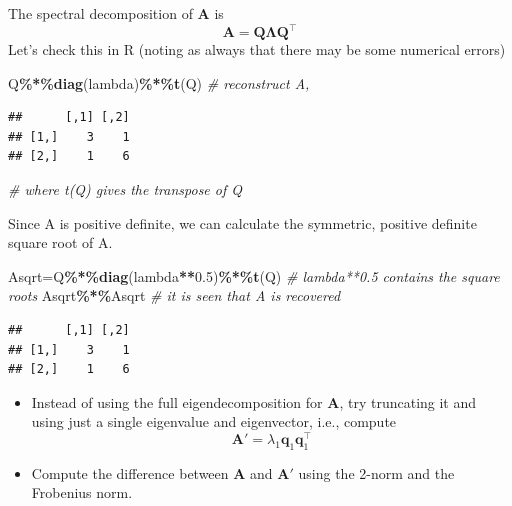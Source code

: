 \documentclass[
]{book}
\newenvironment{Shaded}{\begin{snugshade}}{\end{snugshade}}
\newcommand{\CommentTok}[1]{\textcolor[rgb]{0.56,0.35,0.01}{\textit{#1}}}
\newcommand{\FloatTok}[1]{\textcolor[rgb]{0.00,0.00,0.81}{#1}}
\newcommand{\FunctionTok}[1]{\textcolor[rgb]{0.13,0.29,0.53}{\textbf{#1}}}
\newcommand{\NormalTok}[1]{#1}
\newcommand{\OtherTok}[1]{\textcolor[rgb]{0.56,0.35,0.01}{#1}}
\newcommand{\SpecialCharTok}[1]{\textcolor[rgb]{0.81,0.36,0.00}{\textbf{#1}}}
\providecommand{\tightlist}{%
  \setlength{\itemsep}{0pt}\setlength{\parskip}{0pt}}
\theoremstyle{definition}
\theoremstyle{definition}
\theoremstyle{definition}
\theoremstyle{definition}
\theoremstyle{remark}
\begin{document}
The spectral decomposition of \(\mathbf A\) is
\[\mathbf A= \mathbf Q\boldsymbol \Lambda\mathbf Q^\top\]
Let's check this in R (noting as always that there may be some numerical errors)

\begin{Shaded}
\begin{Highlighting}[]
\NormalTok{Q}\SpecialCharTok{\%*\%}\FunctionTok{diag}\NormalTok{(lambda)}\SpecialCharTok{\%*\%}\FunctionTok{t}\NormalTok{(Q)          }\CommentTok{\# reconstruct A,}
\end{Highlighting}
\end{Shaded}

\begin{verbatim}
##      [,1] [,2]
## [1,]    3    1
## [2,]    1    6
\end{verbatim}

\begin{Shaded}
\begin{Highlighting}[]
                                   \CommentTok{\# where t(Q) gives the transpose of Q}
\end{Highlighting}
\end{Shaded}

Since A is positive definite, we can calculate the symmetric, positive definite square root of A.

\begin{Shaded}
\begin{Highlighting}[]
\NormalTok{Asqrt}\OtherTok{=}\NormalTok{Q}\SpecialCharTok{\%*\%}\FunctionTok{diag}\NormalTok{(lambda}\SpecialCharTok{**}\FloatTok{0.5}\NormalTok{)}\SpecialCharTok{\%*\%}\FunctionTok{t}\NormalTok{(Q) }\CommentTok{\# lambda**0.5 contains the square roots}
\NormalTok{Asqrt}\SpecialCharTok{\%*\%}\NormalTok{Asqrt                      }\CommentTok{\# it is seen that A is recovered}
\end{Highlighting}
\end{Shaded}

\begin{verbatim}
##      [,1] [,2]
## [1,]    3    1
## [2,]    1    6
\end{verbatim}

\begin{itemize}
\tightlist
\item
  Instead of using the full eigendecomposition for \(\mathbf A\), try truncating it and using just a single eigenvalue and eigenvector, i.e., compute
  \[\mathbf A' = \lambda_1 \mathbf q_1 \mathbf q_1^\top\]
\item
  Compute the difference between \(\mathbf A\) and \(\mathbf A'\) using the 2-norm and the Frobenius norm.
\end{itemize}
\end{document}

